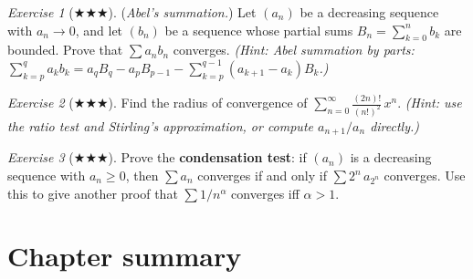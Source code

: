 \documentclass[12pt,a4paper,openany]{book}
\theoremstyle{definition}
\theoremstyle{remark}
\newtheorem{exercise}{Exercise}[chapter]
\begin{document}
\begin{exercise}[$\bigstar\bigstar\bigstar$]\label{exo:series11}
(\textit{Abel's summation.})
Let $(a_n)$ be a decreasing sequence with $a_n \to 0$, and let $(b_n)$ be a
sequence whose partial sums $B_n = \sum_{k=0}^{n}b_k$ are bounded. Prove that
$\sum a_n b_n$ converges.
\textit{(Hint: Abel summation by parts: $\sum_{k=p}^{q}a_k b_k
= a_q B_q - a_p B_{p-1} - \sum_{k=p}^{q-1}(a_{k+1}-a_k)B_k$.)}
\end{exercise}

\begin{exercise}[$\bigstar\bigstar\bigstar$]\label{exo:series12}
Find the radius of convergence of
$\displaystyle\sum_{n=0}^{\infty}\frac{(2n)!}{(n!)^2}\,x^n$.
\textit{(Hint: use the ratio test and Stirling's approximation, or compute
$a_{n+1}/a_n$ directly.)}
\end{exercise}

\begin{exercise}[$\bigstar\bigstar\bigstar$]\label{exo:series13}
Prove the \textbf{condensation test}: if $(a_n)$ is a
decreasing sequence with $a_n \geq 0$, then $\sum a_n$ converges if and only if
$\sum 2^n\, a_{2^n}$ converges. Use this to give another proof that
$\sum 1/n^\alpha$ converges iff $\alpha > 1$.
\end{exercise}

\section*{Chapter summary}
\end{document}

